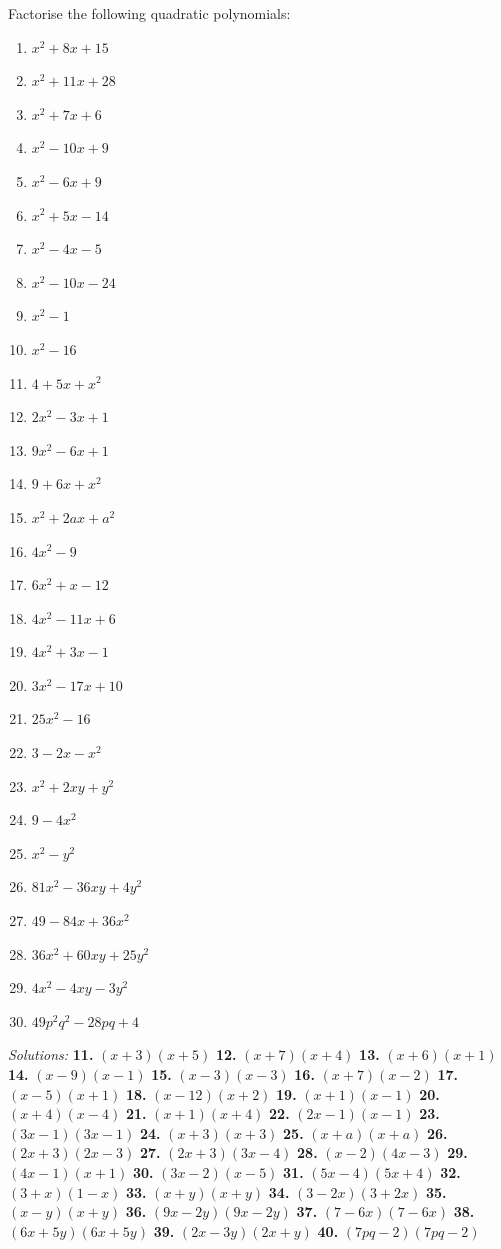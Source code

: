 \documentclass[
  english,
  12pt,
  oneside]{book}
\theoremstyle{definition}
\theoremstyle{definition}
\theoremstyle{definition}
\theoremstyle{definition}
\theoremstyle{remark}
\begin{document}
Factorise the following quadratic polynomials:

\begin{enumerate}
\def\labelenumi{\arabic{enumi}.}
\setcounter{enumi}{10}
\item
  \(x^2+8x+15\)
\item
  \(x^2+11x+28\)
\item
  \(x^2+7x+6\)
\item
  \(x^2-10x+9\)
\item
  \(x^2-6x+9\)
\item
  \(x^2+5x-14\)
\item
  \(x^2-4x-5\)
\item
  \(x^2-10x-24\)
\item
  \(x^2-1\)
\item
  \(x^2-16\)
\item
  \(4+5x+x^2\)
\item
  \(2x^2-3x+1\)
\item
  \(9x^2-6x+1\)
\item
  \(9+6x+x^2\)
\item
  \(x^2+2ax+a^2\)
\item
  \(4x^2-9\)
\item
  \(6x^2+x-12\)
\item
  \(4x^2-11x+6\)
\item
  \(4x^2+3x-1\)
\item
  \(3x^2 - 17x+10\)
\item
  \(25x^2-16\)
\item
  \(3-2x-x^2\)
\item
  \(x^2+2xy+y^2\)
\item
  \(9-4x^2\)
\item
  \(x^2-y^2\)
\item
  \(81x^2-36xy+4y^2\)
\item
  \(49-84x+36x^2\)
\item
  \(36x^2+60xy+25y^2\)
\item
  \(4x^2-4xy-3y^2\)
\item
  \(49p^2q^2 - 28pq +4\)
\end{enumerate}

\emph{Solutions:}
\textbf{11.} \((x+3)(x+5)\)
\textbf{12.} \((x+7)(x+4)\)
\textbf{13.} \((x+6)(x+1)\)
\textbf{14.} \((x-9)(x-1)\)
\textbf{15.} \((x-3)(x-3)\)
\textbf{16.} \((x+7)(x-2)\)
\textbf{17.} \((x-5)(x+1)\)
\textbf{18.} \((x-12)(x+2)\)
\textbf{19.} \((x+1)(x-1)\)
\textbf{20.} \((x+4)(x-4)\)
\textbf{21.} \((x+1)(x+4)\)
\textbf{22.} \((2x-1)(x-1)\)
\textbf{23.} \((3x-1)(3x-1)\)
\textbf{24.} \((x+3)(x+3)\)
\textbf{25.} \((x+a)(x+a)\)
\textbf{26.} \((2x+3)(2x-3)\)
\textbf{27.} \((2x+3)(3x-4)\)
\textbf{28.} \((x-2)(4x-3)\)
\textbf{29.} \((4x-1)(x+1)\)
\textbf{30.} \((3x-2)(x-5)\)
\textbf{31.} \((5x-4)(5x+4)\)
\textbf{32.} \((3+x)(1-x)\)
\textbf{33.} \((x+y)(x+y)\)
\textbf{34.} \((3-2x)(3+2x)\)
\textbf{35.} \((x-y)(x+y)\)
\textbf{36.} \((9x-2y)(9x-2y)\)
\textbf{37.} \((7-6x)(7-6x)\)
\textbf{38.} \((6x+5y)(6x+5y)\)
\textbf{39.} \((2x-3y)(2x+y)\)
\textbf{40.} \((7pq-2)(7pq-2)\)
\end{document}
